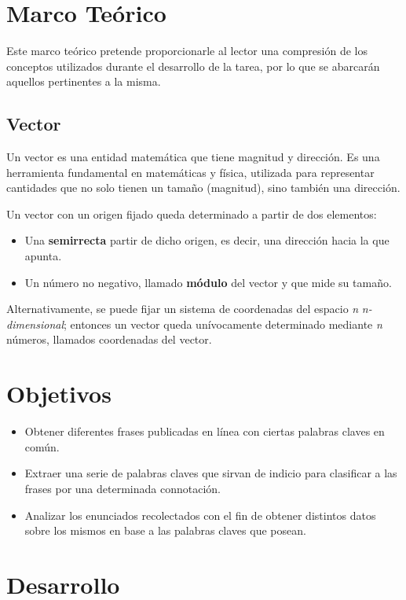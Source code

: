 \documentclass{article}
\begin{document}
    \section{Marco Teórico}\label{sec:marco-teorico}
    Este marco teórico pretende proporcionarle al lector una compresión de los conceptos utilizados durante el
    desarrollo de la tarea, por lo que se abarcarán aquellos pertinentes a la misma.

    \subsection{Vector}\label{subsec:vector}
    Un vector es una entidad matemática que tiene magnitud y dirección.
    Es una herramienta fundamental en matemáticas y física, utilizada para representar cantidades que no solo tienen
    un tamaño (magnitud), sino también una dirección.

    Un vector con un origen fijado queda determinado a partir de dos elementos:
    \begin{itemize}
        \item Una \textbf{semirrecta} partir de dicho origen, es decir, una dirección hacia la que apunta.
        \item Un número no negativo, llamado \textbf{módulo} del vector y que mide su tamaño.
    \end{itemize}

    Alternativamente, se puede fijar un sistema de coordenadas del espacio \textit{n} \textit{n-dimensional};
    entonces un vector queda unívocamente determinado mediante \textit{n} números, llamados coordenadas del vector.

    \section{Objetivos}
    \begin{itemize}
        \item Obtener diferentes frases publicadas en línea con ciertas palabras claves en común.
        \item Extraer una serie de palabras claves que sirvan de indicio para clasificar a las frases
        por una determinada connotación.
        \item Analizar los enunciados recolectados con el fin de obtener distintos datos sobre los mismos en base a las palabras claves que posean.
    \end{itemize}

    \section{Desarrollo}
\end{document}
